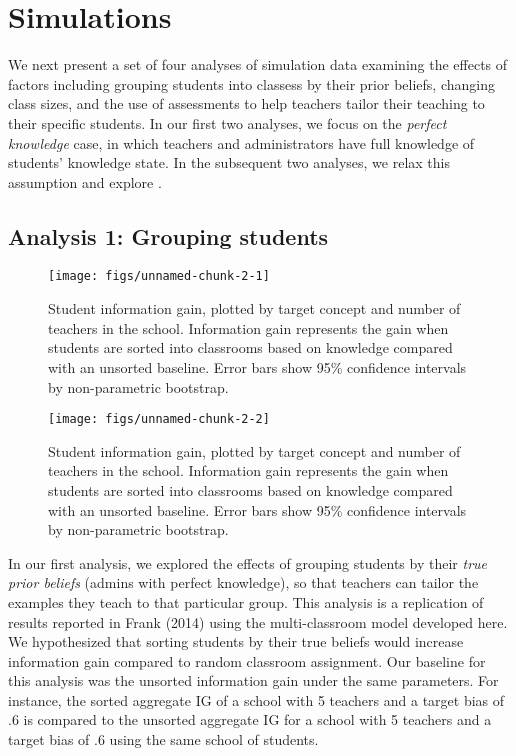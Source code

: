 \documentclass[10pt, letterpaper]{article}
\newenvironment{CodeChunk}{}{}
\begin{document}
\section{Simulations}\label{simulations}

We next present a set of four analyses of simulation data examining the
effects of factors including grouping students into classess by their
prior beliefs, changing class sizes, and the use of assessments to help
teachers tailor their teaching to their specific students. In our first
two analyses, we focus on the \emph{perfect knowledge} case, in which
teachers and administrators have full knowledge of students' knowledge
state. In the subsequent two analyses, we relax this assumption and
explore .

\subsection{Analysis 1: Grouping
students}\label{analysis-1-grouping-students}

\begin{CodeChunk}
\begin{figure}[t]
\texttt{[image: figs/unnamed-chunk-2-1]} \caption[Student information gain, plotted by target concept and number of teachers in the school]{Student information gain, plotted by target concept and number of teachers in the school. Information gain represents the gain when students are sorted into classrooms based on knowledge compared with an unsorted baseline. Error bars show 95\% confidence intervals by non-parametric bootstrap.}\label{fig:unnamed-chunk-21}
\end{figure}
\begin{figure}[t]
\texttt{[image: figs/unnamed-chunk-2-2]} \caption[Student information gain, plotted by target concept and number of teachers in the school]{Student information gain, plotted by target concept and number of teachers in the school. Information gain represents the gain when students are sorted into classrooms based on knowledge compared with an unsorted baseline. Error bars show 95\% confidence intervals by non-parametric bootstrap.}\label{fig:unnamed-chunk-22}
\end{figure}
\end{CodeChunk}

In our first analysis, we explored the effects of grouping students by
their \emph{true prior beliefs} (admins with perfect knowledge), so that
teachers can tailor the examples they teach to that particular group.
This analysis is a replication of results reported in Frank (2014) using
the multi-classroom model developed here. We hypothesized that sorting
students by their true beliefs would increase information gain compared
to random classroom assignment. Our baseline for this analysis was the
unsorted information gain under the same parameters. For instance, the
sorted aggregate IG of a school with 5 teachers and a target bias of .6
is compared to the unsorted aggregate IG for a school with 5 teachers
and a target bias of .6 using the same school of students.
\end{document}

